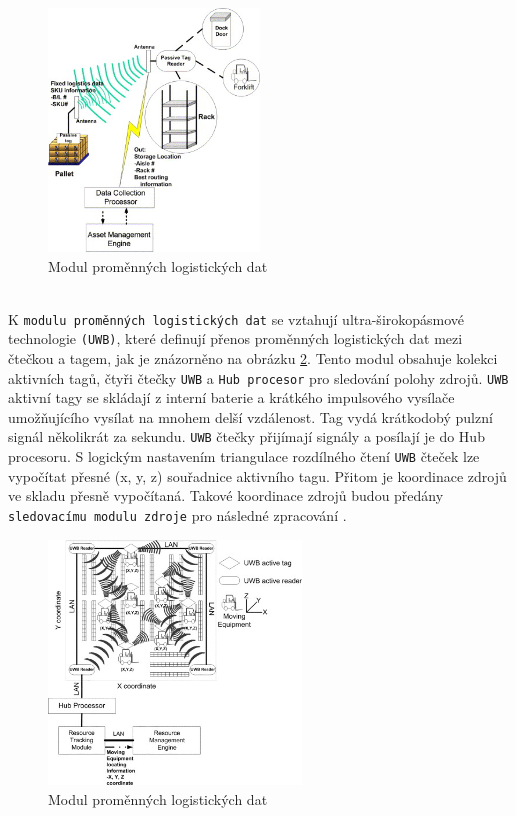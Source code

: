 \documentclass[czech,BP]{thesiskiv}
\begin{document}
\begin{figure}[H]
		\centering
		\includegraphics[width=0.5\textwidth]{../images/passive.jpg}	
		\caption{Modul proměnných logistických dat\cite{chow2006design}}
		\label{fig:passive}
\end{figure}
\ \\
K \texttt{modulu proměnných logistických dat} se vztahují ultra-širokopásmové technologie \texttt{(UWB)}, které definují přenos proměnných logistických dat mezi čtečkou a tagem, jak je znázorněno na obrázku \ref{fig:uwb}. Tento modul obsahuje kolekci aktivních tagů, čtyři čtečky \texttt{UWB} a \texttt{Hub procesor} pro sledování polohy zdrojů. \texttt{UWB} aktivní tagy se skládají z interní baterie a krátkého impulsového vysílače umožňujícího vysílat na mnohem delší vzdálenost. Tag vydá krátkodobý pulzní signál několikrát za sekundu. \texttt{UWB} čtečky přijímají signály a posílají je do Hub procesoru. S logickým nastavením triangulace rozdílného čtení \texttt{UWB} čteček lze vypočítat přesné (x, y, z) souřadnice aktivního tagu. Přitom je koordinace zdrojů ve skladu přesně vypočítaná. Takové koordinace zdrojů budou předány \texttt{sledovacímu modulu zdroje} pro následné zpracování \cite{chow2006design}.


\begin{figure}[H]
		\centering
		\includegraphics[width=0.6\textwidth]{../images/uwb.jpg}	
		\caption{Modul proměnných logistických dat\cite{chow2006design}}
		\label{fig:uwb}
\end{figure}
\end{document}
